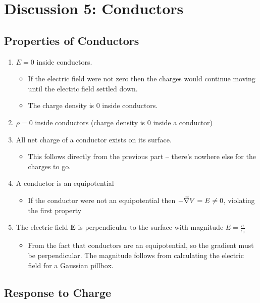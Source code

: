 \chapter{Discussion 5: Conductors}

\section{Properties of Conductors}
\begin{enumerate}
		\item $E = 0$ inside conductors. 
				\begin{itemize}
						\item If the electric field were not zero then the charges would continue moving until
								the electric field settled down.
						\item The charge density is 0 inside conductors.
				\end{itemize}
		\item $\rho = 0$ inside conductors (charge density is 0 inside a conductor) {}
		\item All net charge of a conductor exists on its surface.
				\begin{itemize}
						\item This follows directly from the previous part -- there's nowhere else for the charges
								to go. 
				\end{itemize}
		\item A conductor is an equipotential
				\begin{itemize}
						\item If the conductor were not an equipotential then $-\vec{\nabla} V = E \neq 0$, violating the 
						first property
				\end{itemize}
		\item The electric field $\mathbf E$ is perpendicular to the surface with magnitude 
				$E = \frac{\sigma}{\epsilon_0}$
				\begin{itemize}
						\item From the fact that conductors are an equipotential, so the gradient must be 
								perpendicular. The magnitude follows from calculating the electric field for a 
								Gaussian pillbox. 
				\end{itemize}
\end{enumerate}

\section{Response to Charge}

